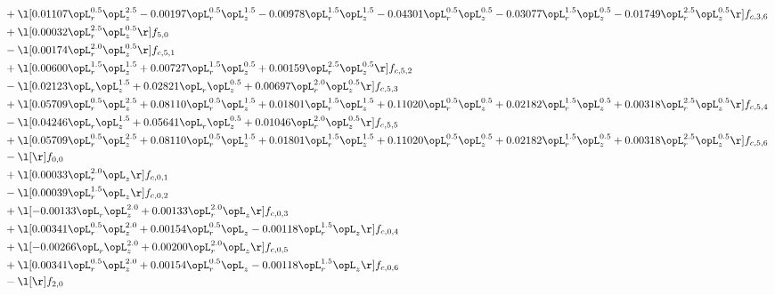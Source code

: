\begin{alignat}{2}
& + \l[  0.01107 \opL_r^{0.5} \opL_z^{2.5}   -0.00197 \opL_r^{0.5} \opL_z^{1.5}   -0.00978 \opL_r^{1.5} \opL_z^{1.5}   -0.04301 \opL_r^{0.5} \opL_z^{0.5}   -0.03077 \opL_r^{1.5} \opL_z^{0.5}   -0.01749 \opL_r^{2.5} \opL_z^{0.5}  \r] f_{c,3,6} \nonumber \\ 
& + \l[  0.00032 \opL_r^{2.5} \opL_z^{0.5}  \r] f_{5,0} \nonumber \\ 
& - \l[  0.00174 \opL_r^{2.0} \opL_z^{0.5}  \r] f_{c,5,1} \nonumber \\ 
& + \l[  0.00600 \opL_r^{1.5} \opL_z^{1.5} +  0.00727 \opL_r^{1.5} \opL_z^{0.5} +  0.00159 \opL_r^{2.5} \opL_z^{0.5}  \r] f_{c,5,2} \nonumber \\ 
& - \l[  0.02123 \opL_r \opL_z^{1.5} +  0.02821 \opL_r \opL_z^{0.5} +  0.00697 \opL_r^{2.0} \opL_z^{0.5}  \r] f_{c,5,3} \nonumber \\ 
& + \l[  0.05709 \opL_r^{0.5} \opL_z^{2.5} +  0.08110 \opL_r^{0.5} \opL_z^{1.5} +  0.01801 \opL_r^{1.5} \opL_z^{1.5} +  0.11020 \opL_r^{0.5} \opL_z^{0.5} +  0.02182 \opL_r^{1.5} \opL_z^{0.5} +  0.00318 \opL_r^{2.5} \opL_z^{0.5}  \r] f_{c,5,4} \nonumber \\ 
& - \l[  0.04246 \opL_r \opL_z^{1.5} +  0.05641 \opL_r \opL_z^{0.5} +  0.01046 \opL_r^{2.0} \opL_z^{0.5}  \r] f_{c,5,5} \nonumber \\ 
& + \l[  0.05709 \opL_r^{0.5} \opL_z^{2.5} +  0.08110 \opL_r^{0.5} \opL_z^{1.5} +  0.01801 \opL_r^{1.5} \opL_z^{1.5} +  0.11020 \opL_r^{0.5} \opL_z^{0.5} +  0.02182 \opL_r^{1.5} \opL_z^{0.5} +  0.00318 \opL_r^{2.5} \opL_z^{0.5}  \r] f_{c,5,6} \nonumber \\ 
& - \l[  \r] f_{0,0} \nonumber \\ 
& + \l[  0.00033 \opL_r^{2.0} \opL_z  \r] f_{c,0,1} \nonumber \\ 
& - \l[  0.00039 \opL_r^{1.5} \opL_z  \r] f_{c,0,2} \nonumber \\ 
& + \l[  -0.00133 \opL_r \opL_z^{2.0} +  0.00133 \opL_r^{2.0} \opL_z  \r] f_{c,0,3} \nonumber \\ 
& + \l[  0.00341 \opL_r^{0.5} \opL_z^{2.0} +  0.00154 \opL_r^{0.5} \opL_z   -0.00118 \opL_r^{1.5} \opL_z  \r] f_{c,0,4} \nonumber \\ 
& + \l[  -0.00266 \opL_r \opL_z^{2.0} +  0.00200 \opL_r^{2.0} \opL_z  \r] f_{c,0,5} \nonumber \\ 
& + \l[  0.00341 \opL_r^{0.5} \opL_z^{2.0} +  0.00154 \opL_r^{0.5} \opL_z   -0.00118 \opL_r^{1.5} \opL_z  \r] f_{c,0,6} \nonumber \\ 
& - \l[  \r] f_{2,0} \nonumber \\ 

\end{alignat}
